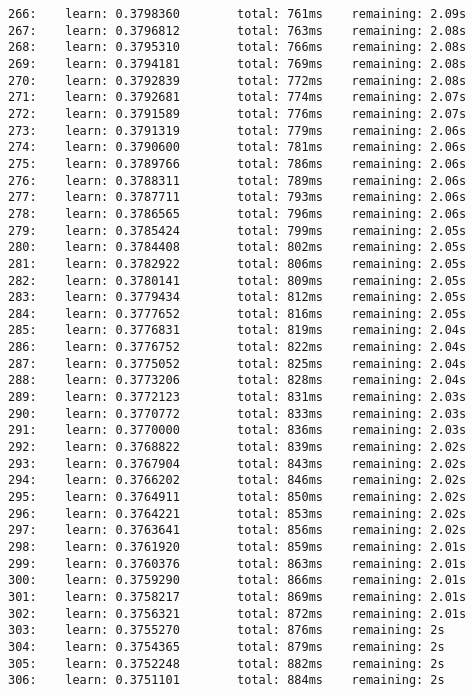 \documentclass[11pt]{article}
\begin{document}
\begin{Verbatim}[commandchars=\\\{\}]
266:    learn: 0.3798360        total: 761ms    remaining: 2.09s
267:    learn: 0.3796812        total: 763ms    remaining: 2.08s
268:    learn: 0.3795310        total: 766ms    remaining: 2.08s
269:    learn: 0.3794181        total: 769ms    remaining: 2.08s
270:    learn: 0.3792839        total: 772ms    remaining: 2.08s
271:    learn: 0.3792681        total: 774ms    remaining: 2.07s
272:    learn: 0.3791589        total: 776ms    remaining: 2.07s
273:    learn: 0.3791319        total: 779ms    remaining: 2.06s
274:    learn: 0.3790600        total: 781ms    remaining: 2.06s
275:    learn: 0.3789766        total: 786ms    remaining: 2.06s
276:    learn: 0.3788311        total: 789ms    remaining: 2.06s
277:    learn: 0.3787711        total: 793ms    remaining: 2.06s
278:    learn: 0.3786565        total: 796ms    remaining: 2.06s
279:    learn: 0.3785424        total: 799ms    remaining: 2.05s
280:    learn: 0.3784408        total: 802ms    remaining: 2.05s
281:    learn: 0.3782922        total: 806ms    remaining: 2.05s
282:    learn: 0.3780141        total: 809ms    remaining: 2.05s
283:    learn: 0.3779434        total: 812ms    remaining: 2.05s
284:    learn: 0.3777652        total: 816ms    remaining: 2.05s
285:    learn: 0.3776831        total: 819ms    remaining: 2.04s
286:    learn: 0.3776752        total: 822ms    remaining: 2.04s
287:    learn: 0.3775052        total: 825ms    remaining: 2.04s
288:    learn: 0.3773206        total: 828ms    remaining: 2.04s
289:    learn: 0.3772123        total: 831ms    remaining: 2.03s
290:    learn: 0.3770772        total: 833ms    remaining: 2.03s
291:    learn: 0.3770000        total: 836ms    remaining: 2.03s
292:    learn: 0.3768822        total: 839ms    remaining: 2.02s
293:    learn: 0.3767904        total: 843ms    remaining: 2.02s
294:    learn: 0.3766202        total: 846ms    remaining: 2.02s
295:    learn: 0.3764911        total: 850ms    remaining: 2.02s
296:    learn: 0.3764221        total: 853ms    remaining: 2.02s
297:    learn: 0.3763641        total: 856ms    remaining: 2.02s
298:    learn: 0.3761920        total: 859ms    remaining: 2.01s
299:    learn: 0.3760376        total: 863ms    remaining: 2.01s
300:    learn: 0.3759290        total: 866ms    remaining: 2.01s
301:    learn: 0.3758217        total: 869ms    remaining: 2.01s
302:    learn: 0.3756321        total: 872ms    remaining: 2.01s
303:    learn: 0.3755270        total: 876ms    remaining: 2s
304:    learn: 0.3754365        total: 879ms    remaining: 2s
305:    learn: 0.3752248        total: 882ms    remaining: 2s
306:    learn: 0.3751101        total: 884ms    remaining: 2s

\end{Verbatim}
\end{document}
